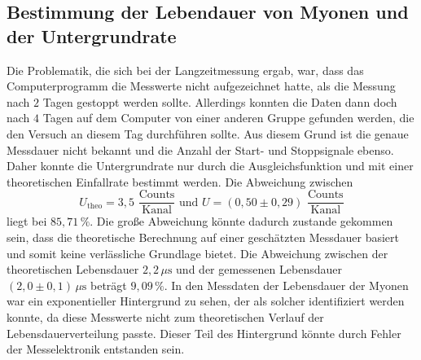 \subsection{Bestimmung der Lebendauer von Myonen und der Untergrundrate}
Die Problematik, die sich bei der Langzeitmessung ergab, war, dass das Computerprogramm die Messwerte nicht aufgezeichnet hatte, als
die Messung nach $2$ Tagen gestoppt werden sollte. Allerdings konnten die Daten dann doch nach $4$ Tagen auf dem Computer von einer 
anderen Gruppe gefunden werden, die den Versuch an diesem Tag durchführen sollte. Aus diesem Grund ist die genaue Messdauer nicht
bekannt und die Anzahl der Start- und Stoppsignale ebenso. Daher konnte die Untergrundrate nur durch die Ausgleichsfunktion und 
mit einer theoretischen Einfallrate bestimmt werden. Die Abweichung zwischen 
$$U_{\text{theo}} = 3,5 \,\, \frac{\text{Counts}}{\text{Kanal}}\,\, \text{und} \,\, U = (0,50 \pm 0,29) \,\, \frac{\text{Counts}}{\text{Kanal}}$$
liegt bei $85,71 \, \%$.
Die große Abweichung könnte dadurch zustande gekommen sein, dass die theoretische Berechnung auf einer geschätzten Messdauer basiert und somit keine verlässliche Grundlage bietet.
Die Abweichung zwischen der theoretischen Lebensdauer $2,2 \, \unit{\mu\second}$ und der gemessenen Lebensdauer 
$(2,0 \pm 0,1)\, \unit{\mu\second}$ beträgt $9,09 \, \%$. In den Messdaten der Lebensdauer der Myonen war ein exponentieller Hintergrund zu sehen, der als solcher identifiziert werden konnte, da diese Messwerte nicht zum theoretischen Verlauf der Lebensdauerverteilung passte. Dieser Teil des Hintergrund könnte durch Fehler der Messelektronik entstanden sein.


